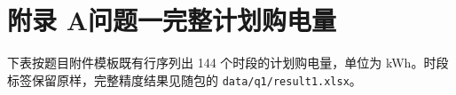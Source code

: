 \clearpage
\section*{附录 A\quad 问题一完整计划购电量}
下表按题目附件模板既有行序列出 144 个时段的计划购电量，单位为 kWh。时段标签保留原样，完整精度结果见随包的 \texttt{data/q1/result1.xlsx}。

